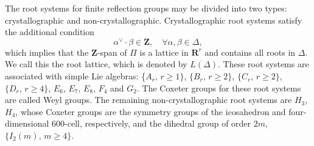 \documentclass[a4paper,12pt]{article}
\begin{document}
The root systems for finite reflection groups may be divided into two
types: crystallographic and non-crystallographic.
Crystallographic root systems satisfy the additional condition
\begin{equation}
   \alpha^{\vee}\!\!\cdot\beta\in\mathbf{Z},\quad \forall
   \alpha,\beta\in\Delta,
\end{equation}
which implies that the \(\mathbf{Z}\)-span of \(\Pi\) is a lattice in
\(\mathbf{R}^{r}\) and  contains all roots in \(\Delta\).
We call this the root lattice, which is denoted by \(L(\Delta)\).
These root systems are associated with simple Lie
algebras: \{\(A_{r},\,r\ge 1\}\), \(\{B_{r},\,r\ge 2\}\), \(\{C_{r},\,r\ge
2\}\),
\(\{D_{r},\,r\ge 4\}\), \(E_{6}\), \(E_{7}\), \(E_{8}\), \(F_{4}\) and
\(G_{2}\).  The Coxeter groups for these root
systems are called Weyl groups.  The remaining non-crystallographic root
systems %
are \(H_{3}\), \(H_{4}\), whose Coxeter groups are the
symmetry groups of the icosahedron and four-dimensional 600-cell,
respectively,
and the dihedral group of order \(2m\), \(\{I_{2}(m),\,m\ge 4\}\).
\end{document}
